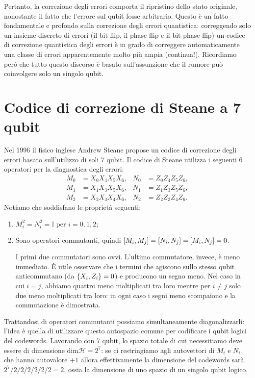 \noindent Pertanto, la correzione degli errori comporta il ripristino dello stato originale, nonostante il fatto che l'errore sul qubit fosse arbitrario. Questo è un fatto fondamentale e profondo sulla correzione degli errori quantistica: correggendo solo un insieme discreto di errori (il bit flip, il phase flip e il bit-phase flip) un codice di correzione quantistica degli errori è in grado di correggere automaticamente una classe di errori apparentemente molto più ampia (continua!). Ricordiamo però che tutto questo discorso è basato sull'assunzione che il rumore può coinvolgere  solo un singolo qubit.

\section{Codice di correzione di Steane a 7 qubit}
Nel 1996 il fisico inglese Andrew Steane propose un codice di correzione degli errori basato sull'utilizzo di soli 7 qubit. Il codice di Steane utilizza i seguenti 6 operatori per la diagnostica degli errori:
\begin{align*}
    M_0 &= X_0X_4X_5X_6, &N_0 &= Z_0Z_4Z_5Z_6, \\
    M_1 &= X_1X_3X_5X_6, &N_1 &= Z_1Z_3Z_5Z_6, \\
    M_2 &= X_2X_3X_4X_6, &N_2 &= Z_2Z_3Z_4Z_6.
\end{align*}
Notiamo che soddisfano le proprietà seguenti:
\begin{enumerate}
    \item $M_i^2 = N_i^2=\mathbb{I}$ per $i = 0, 1, 2$;
    \item Sono operatori commutanti, quindi $\comm{M_i}{M_j}=\comm{N_i}{N_j}=\comm{M_i}{N_j}=0$.
    
    I primi due commutatori sono ovvi. L'ultimo commutatore, invece, è meno immediato. È utile osservare che i termini che agiscono sullo stesso qubit anticommutano (da $\acomm{X_i}{Z_i} = 0$) e producono un segno meno. Nel caso in cui $i=j$, abbiamo quattro meno moltiplicati tra loro mentre per $i\neq j$ solo due meno moltiplicati tra loro: in ogni caso i segni meno scompaiono e la commutazione è dimostrata. 
\end{enumerate}

\noindent Trattandosi di operatori commutanti possiamo simultaneamente diagonalizzarli: l'idea è quella di utilizzare questo autospazio comune per codificare i qubit logici del codewords. Lavorando con 7 qubit, lo spazio totale di cui necessitiamo deve essere di dimensione $\text{dim} \mathcal{H}=2^7$: se ci restringiamo agli autovettori di $M_i$ e $N_i$ che hanno autovalore $+1$ allora effettivamente la dimensione del codewords sarà $2^7/2/2/2/2/2/2 = 2$, ossia la dimensione di uno spazio di un singolo qubit logico.

